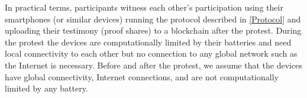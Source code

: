 In practical terms, participants witness each other's participation
using their smartphones (or similar devices) running the protocol described in
\cref{Protocol} and uploading their testimony (\ie proof shares) to a blockchain 
after the protest. During the protest the devices are computationally limited by 
their batteries and need local connectivity to each other but no connection to
any global network such as the Internet is necessary. Before and
after the protest, we assume that the devices have global connectivity, \ie 
Internet  connections, and are not computationally limited by any battery.











